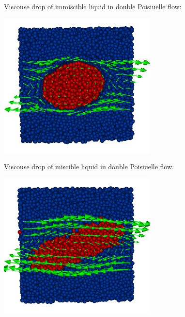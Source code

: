 Viscouse drop of immiscible liquid in double Poisiuelle flow:
\begin{center}
\includegraphics[width=0.6\textwidth]{i/drop/a/visit.png}
\end{center}

Viscouse drop of miscible liquid in double Poisiuelle flow.
\begin{center}
\includegraphics[width=0.6\textwidth]{i/drop/b/visit.png}
\end{center}
